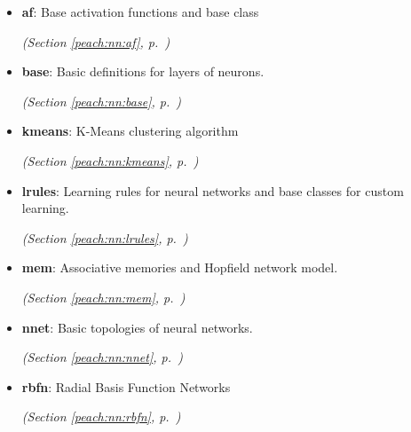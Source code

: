 \begin{itemize}
\setlength{\parskip}{0ex}
\item \textbf{af}: 
Base activation functions and base class


  \textit{(Section \ref{peach:nn:af}, p.~\pageref{peach:nn:af})}

\item \textbf{base}: 
Basic definitions for layers of neurons.


  \textit{(Section \ref{peach:nn:base}, p.~\pageref{peach:nn:base})}

\item \textbf{kmeans}: 
K-Means clustering algorithm


  \textit{(Section \ref{peach:nn:kmeans}, p.~\pageref{peach:nn:kmeans})}

\item \textbf{lrules}: 
Learning rules for neural networks and base classes for custom learning.


  \textit{(Section \ref{peach:nn:lrules}, p.~\pageref{peach:nn:lrules})}

\item \textbf{mem}: 
Associative memories and Hopfield network model.


  \textit{(Section \ref{peach:nn:mem}, p.~\pageref{peach:nn:mem})}

\item \textbf{nnet}: 
Basic topologies of neural networks.


  \textit{(Section \ref{peach:nn:nnet}, p.~\pageref{peach:nn:nnet})}

\item \textbf{rbfn}: 
Radial Basis Function Networks


  \textit{(Section \ref{peach:nn:rbfn}, p.~\pageref{peach:nn:rbfn})}

\end{itemize}

